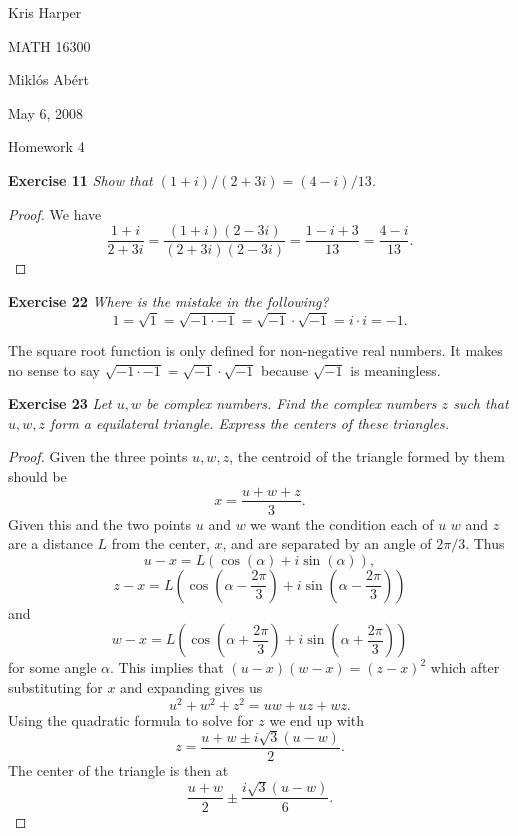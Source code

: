 \documentclass{article}
\begin{document}
\begin{flushright}
Kris Harper

MATH 16300

Mikl\'{o}s Ab\'{e}rt

May 6, 2008
\end{flushright}

\begin{center}
Homework 4
\end{center}

\begin{flushleft}

\textbf{Exercise 11}
\textsl{Show that $(1+i)/(2+3i) = (4-i)/13$.}
\begin{proof}
We have
\[
\frac{1+i}{2+3i} = \frac{(1+i)(2-3i)}{(2+3i)(2-3i)} = \frac{1-i+3}{13} = \frac{4-i}{13}.
\]
\end{proof}

\textbf{Exercise 22}
\textsl{Where is the mistake in the following?
\[
1 = \sqrt{1} = \sqrt{-1 \cdot -1}  = \sqrt{-1} \cdot \sqrt{-1} = i \cdot i = -1.
\]}

The square root function is only defined for non-negative real numbers. It makes no sense to say $\sqrt{-1 \cdot -1} = \sqrt{-1} \cdot \sqrt{-1}$ because $\sqrt{-1}$ is meaningless.\newline

\textbf{Exercise 23}
\textsl{Let $u,w$ be complex numbers. Find the complex numbers $z$ such that $u,w,z$ form a equilateral triangle. Express the centers of these triangles.}
\begin{proof}
Given the three points $u,w,z$, the centroid of the triangle formed by them should be
\[
x = \frac{u+w+z}{3}.
\]
Given this and the two points $u$ and $w$ we want the condition each of $u$ $w$ and $z$ are a distance $L$ from the center, $x$, and are separated by an angle of $2 \pi /3$. Thus
\[
u-x = L \left ( \cos \left ( \alpha \right ) + i \sin \left ( \alpha \right ) \right ),
\]
\[
z-x = L \left ( \cos \left ( \alpha - \frac{2 \pi}{3} \right ) + i \sin \left ( \alpha - \frac{2 \pi}{3} \right ) \right )
\]
and
\[
w-x = L \left ( \cos \left ( \alpha + \frac{2 \pi}{3} \right ) + i \sin \left ( \alpha + \frac{2 \pi}{3} \right ) \right )
\]
for some angle $\alpha$. This implies that $(u-x)(w-x) = (z-x)^2$ which after substituting for $x$ and expanding gives us
\[
u^2 + w^2 + z^2 = uw + uz + wz.
\]
Using the quadratic formula to solve for $z$ we end up with
\[
z = \frac{u + w \pm i \sqrt{3}(u-w)}{2}.
\]
The center of the triangle is then at
\[
\frac{u+w}{2} \pm \frac{i \sqrt{3} (u-w)}{6}.
\]
\end{proof}


\end{flushleft}
\end{document}
